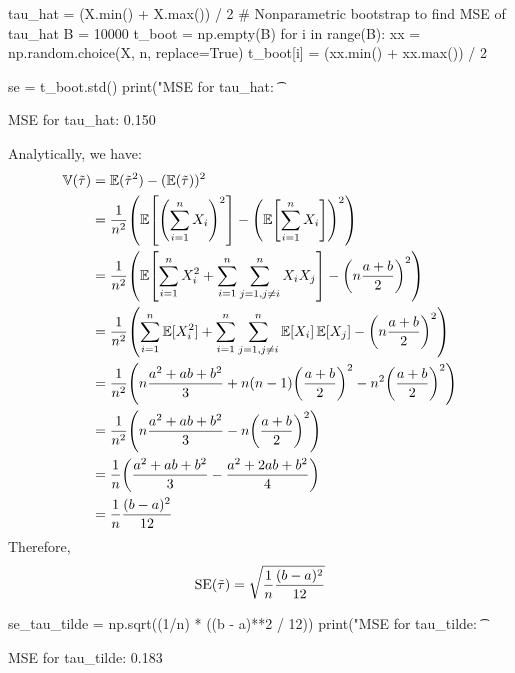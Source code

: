 \begin{python}
tau_hat = (X.min() + X.max()) / 2
# Nonparametric bootstrap to find MSE of tau_hat
B = 10000
t_boot = np.empty(B)
for i in range(B):
    xx = np.random.choice(X, n, replace=True)
    t_boot[i] = (xx.min() + xx.max()) / 2
    
se = t_boot.std()
print("MSE for tau_hat: \t %
\end{python}
\begin{console}
MSE for tau\_hat:         0.150
\end{console}
Analytically, we have:
\begin{align*}
\VAR(\tilde{\tau}) 
&= \EXP(\tilde{\tau}^{2}) - (\EXP(\tilde{\tau}))^{2} \\
&= \frac{1}{n^{2}}\left(\EXP\left[ \left(\sum_{i=1}^{n} X_{i}\right)^{2}\right] - \left(\EXP\left[\sum_{i=1}^{n} X_{i} \right]\right)^{2}\right) \\
&= \frac{1}{n^{2}}\left( \EXP\left[ \sum_{i=1}^{n} X_{i}^{2} + \sum_{i=1}^{n} \sum_{j=1, j \neq i}^{n} X_{i} X_{j} \right] - \left(n \frac{a + b}{2}\right)^{2}\right) \\
&= \frac{1}{n^{2}}\left( \sum_{i=1}^{n} \EXP[X_{i}^{2}] + \sum_{i=1}^{n} \sum_{j=1, j \neq i}^{n} \EXP[X_{i}]\EXP[X_{j}]  - \left(n \frac{a + b}{2}\right)^{2}\right) \\
&= \frac{1}{n^{2}}\left( n \frac{a^{2} + ab + b^{2}}{3} + n(n-1) \left(\frac{a+b}{2}\right)^{2}  - n^{2}\left(\frac{a + b}{2}\right)^{2}\right) \\
&= \frac{1}{n^{2}}\left( n \frac{a^{2} + ab + b^{2}}{3} - n \left(\frac{a+b}{2}\right)^{2} \right) \\
&= \frac{1}{n} \left( \frac{a^{2} + ab + b^{2}}{3} - \frac{a^{2} + 2ab + b^{2}}{4}\right) \\
&= \frac{1}{n} \frac{(b - a)^{2}}{12}
\end{align*}
Therefore,
\[
\operatorname{\mathrm{SE}} (\tilde{\tau}) = \sqrt{\frac{1}{n} \frac{(b - a)^{2}}{12}}
\]

\begin{python}
se_tau_tilde = np.sqrt((1/n) * ((b - a)**2 / 12))
print("MSE for tau_tilde: \t %
\end{python}
\begin{console}
MSE for tau\_tilde:       0.183
\end{console}

